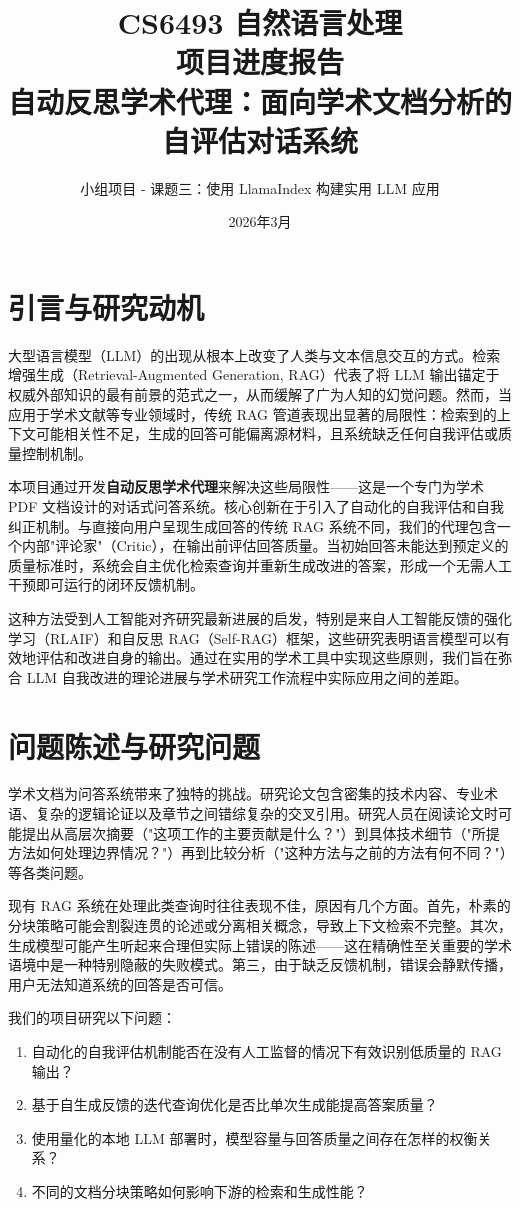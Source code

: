 \documentclass[11pt,a4paper]{article}
\title{CS6493 自然语言处理 \\ 项目进度报告 \\ \vspace{0.5em} \large 自动反思学术代理：面向学术文档分析的自评估对话系统}
\author{小组项目 - 课题三：使用 LlamaIndex 构建实用 LLM 应用}
\date{2026年3月}
\begin{document}
\maketitle

\section{引言与研究动机}

大型语言模型（LLM）的出现从根本上改变了人类与文本信息交互的方式。检索增强生成（Retrieval-Augmented Generation, RAG）代表了将 LLM 输出锚定于权威外部知识的最有前景的范式之一，从而缓解了广为人知的幻觉问题。然而，当应用于学术文献等专业领域时，传统 RAG 管道表现出显著的局限性：检索到的上下文可能相关性不足，生成的回答可能偏离源材料，且系统缺乏任何自我评估或质量控制机制。

本项目通过开发\textbf{自动反思学术代理}来解决这些局限性——这是一个专门为学术 PDF 文档设计的对话式问答系统。核心创新在于引入了自动化的自我评估和自我纠正机制。与直接向用户呈现生成回答的传统 RAG 系统不同，我们的代理包含一个内部"评论家"（Critic），在输出前评估回答质量。当初始回答未能达到预定义的质量标准时，系统会自主优化检索查询并重新生成改进的答案，形成一个无需人工干预即可运行的闭环反馈机制。

这种方法受到人工智能对齐研究最新进展的启发，特别是来自人工智能反馈的强化学习（RLAIF）和自反思 RAG（Self-RAG）框架，这些研究表明语言模型可以有效地评估和改进自身的输出。通过在实用的学术工具中实现这些原则，我们旨在弥合 LLM 自我改进的理论进展与学术研究工作流程中实际应用之间的差距。

\section{问题陈述与研究问题}

学术文档为问答系统带来了独特的挑战。研究论文包含密集的技术内容、专业术语、复杂的逻辑论证以及章节之间错综复杂的交叉引用。研究人员在阅读论文时可能提出从高层次摘要（"这项工作的主要贡献是什么？"）到具体技术细节（"所提方法如何处理边界情况？"）再到比较分析（"这种方法与之前的方法有何不同？"）等各类问题。

现有 RAG 系统在处理此类查询时往往表现不佳，原因有几个方面。首先，朴素的分块策略可能会割裂连贯的论述或分离相关概念，导致上下文检索不完整。其次，生成模型可能产生听起来合理但实际上错误的陈述——这在精确性至关重要的学术语境中是一种特别隐蔽的失败模式。第三，由于缺乏反馈机制，错误会静默传播，用户无法知道系统的回答是否可信。

我们的项目研究以下问题：
\begin{enumerate}
    \item 自动化的自我评估机制能否在没有人工监督的情况下有效识别低质量的 RAG 输出？
    \item 基于自生成反馈的迭代查询优化是否比单次生成能提高答案质量？
    \item 使用量化的本地 LLM 部署时，模型容量与回答质量之间存在怎样的权衡关系？
    \item 不同的文档分块策略如何影响下游的检索和生成性能？
\end{enumerate}
\end{document}
